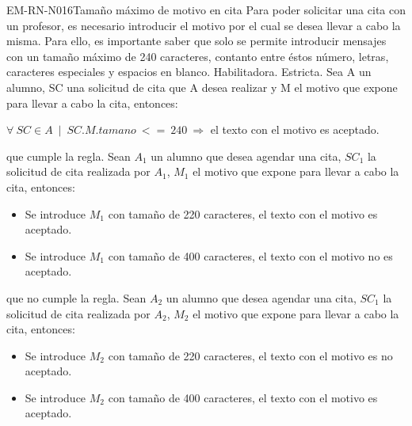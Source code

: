 \begin{BussinesRule}{EM-RN-N016}{Tamaño máximo de motivo en cita}
	\BRitem[Descripción:] Para poder solicitar una cita con un profesor, es necesario introducir el motivo por el cual se desea llevar a cabo la misma. Para ello, es importante saber que solo se permite introducir mensajes con un tamaño máximo de 240 caracteres, contanto entre éstos número, letras, caracteres especiales y espacios en blanco.  
	\BRitem[Tipo: ] Habilitadora.
	\BRitem[Nivel: ] Estricta.
	\BRitem[Sentenia: ] Sea A un alumno, SC una solicitud de cita que A desea realizar y M el motivo que expone para llevar a cabo la cita, entonces:
	\begin{center}
		$\forall \: SC \in A \: \mid \: SC.M.tamano \: <= \: 240 \: \Rightarrow$ el texto con el motivo es aceptado.
	\end{center}
	 que cumple la regla.
		Sean $A_{1}$ un alumno que desea agendar una cita, $SC_{1}$ la solicitud de cita realizada por $A_{1}$, $M_{1}$ el motivo que expone para llevar a cabo la cita, entonces:
		\begin{itemize}
			\item Se introduce $M_{1}$ con tamaño de 220 caracteres, el texto con el motivo es aceptado.
			\item Se introduce $M_{1}$ con tamaño de 400 caracteres, el texto con el motivo no es aceptado.
		\end{itemize}
	 que no cumple la regla.
		Sean $A_{2}$ un alumno que desea agendar una cita, $SC_{1}$ la solicitud de cita realizada por $A_{2}$, $M_{2}$ el motivo que expone para llevar a cabo la cita, entonces:
		\begin{itemize}
			\item Se introduce $M_{2}$ con tamaño de 220 caracteres, el texto con el motivo es no aceptado.
			\item Se introduce $M_{2}$ con tamaño de 400 caracteres, el texto con el motivo es aceptado.
		\end{itemize}

\end{BussinesRule}